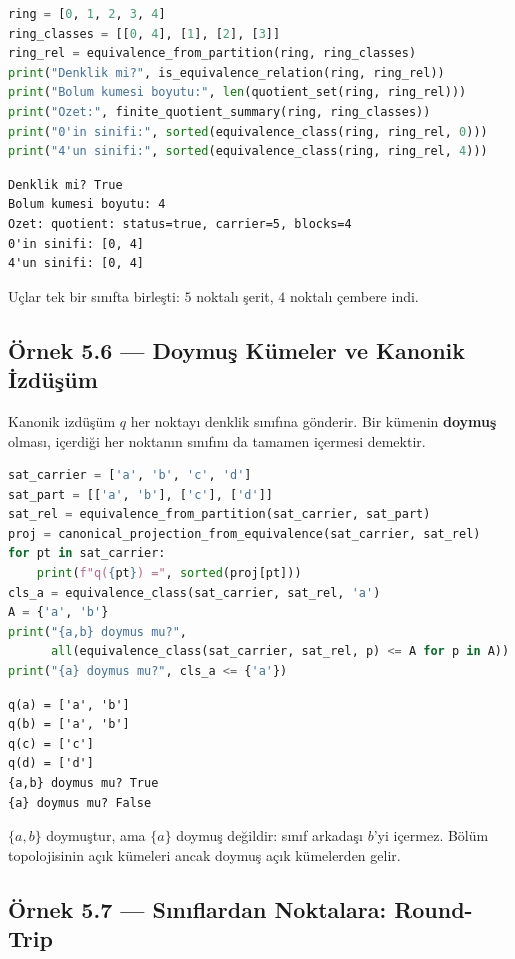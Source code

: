 \begin{lstlisting}[language=Python]
ring = [0, 1, 2, 3, 4]
ring_classes = [[0, 4], [1], [2], [3]]
ring_rel = equivalence_from_partition(ring, ring_classes)
print("Denklik mi?", is_equivalence_relation(ring, ring_rel))
print("Bolum kumesi boyutu:", len(quotient_set(ring, ring_rel)))
print("Ozet:", finite_quotient_summary(ring, ring_classes))
print("0'in sinifi:", sorted(equivalence_class(ring, ring_rel, 0)))
print("4'un sinifi:", sorted(equivalence_class(ring, ring_rel, 4)))
\end{lstlisting}

\begin{verbatim}
Denklik mi? True
Bolum kumesi boyutu: 4
Ozet: quotient: status=true, carrier=5, blocks=4
0'in sinifi: [0, 4]
4'un sinifi: [0, 4]
\end{verbatim}

Uçlar tek bir sınıfta birleşti: $5$ noktalı şerit, $4$ noktalı çembere indi.

\subsection*{Örnek 5.6 — Doymuş Kümeler ve Kanonik İzdüşüm}

Kanonik izdüşüm $q$ her noktayı denklik sınıfına gönderir. Bir kümenin
\textbf{doymuş} olması, içerdiği her noktanın sınıfını da tamamen içermesi
demektir.

\begin{lstlisting}[language=Python]
sat_carrier = ['a', 'b', 'c', 'd']
sat_part = [['a', 'b'], ['c'], ['d']]
sat_rel = equivalence_from_partition(sat_carrier, sat_part)
proj = canonical_projection_from_equivalence(sat_carrier, sat_rel)
for pt in sat_carrier:
    print(f"q({pt}) =", sorted(proj[pt]))
cls_a = equivalence_class(sat_carrier, sat_rel, 'a')
A = {'a', 'b'}
print("{a,b} doymus mu?",
      all(equivalence_class(sat_carrier, sat_rel, p) <= A for p in A))
print("{a} doymus mu?", cls_a <= {'a'})
\end{lstlisting}

\begin{verbatim}
q(a) = ['a', 'b']
q(b) = ['a', 'b']
q(c) = ['c']
q(d) = ['d']
{a,b} doymus mu? True
{a} doymus mu? False
\end{verbatim}

$\{a, b\}$ doymuştur, ama $\{a\}$ doymuş değildir: sınıf arkadaşı $b$'yi
içermez. Bölüm topolojisinin açık kümeleri ancak doymuş açık kümelerden gelir.

\subsection*{Örnek 5.7 — Sınıflardan Noktalara: Round-Trip}

